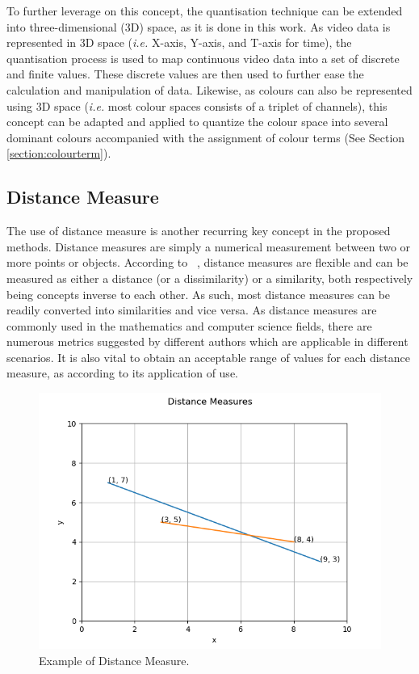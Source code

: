 To further leverage on this concept, the quantisation technique
can be extended into three-dimensional (3D) space, as it is done in this work. As video data is represented in 3D space (\emph{i.e.} X-axis, Y-axis, and T-axis for time), the quantisation process is used to map continuous video data into a set of discrete
and finite values. These discrete values are then used to further ease the
calculation and manipulation of data. Likewise, as colours can also be
represented using 3D space (\emph{i.e.} most colour spaces consists of a triplet of channels), this concept can be adapted and applied to quantize the colour space into several dominant colours accompanied
with the assignment of colour terms (See Section \ref{section:colourterm}).



\vspace{1em}
\subsection{Distance Measure}
\label{section:distancemeasures}

The use of distance measure is another recurring key concept in the proposed
methods. Distance measures are simply a numerical measurement between
two or more points or objects. According to ~\cite{mccune2002distance},
distance measures are flexible and can be measured as either a distance (or a dissimilarity)
or a similarity, both respectively being concepts inverse to each other. As such, most distance measures can be readily converted into
similarities and vice versa. 
As distance measures are commonly used in the mathematics and
computer science fields, there are numerous metrics suggested by different
authors which are applicable in different scenarios. It is also
vital to obtain an acceptable range of values for each distance measure, as according to its application of use.

\begin{figure}[hbt!]
 \centering
 \includegraphics[width=.7\textwidth]{image/general/distance.png}
 \caption{Example of Distance Measure.}
 \label{fig:distanceMeasure}
\end{figure}

